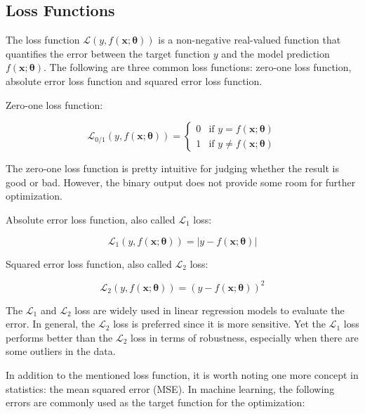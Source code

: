 \documentclass[
	parskip, 			   %
	twoside, 			   %
	DIV=14, 			   %
	BCOR=15.0mm, 		   %
	headsepline, 		   %
	open=right, 		   %
	captions=tableheading, %
	bibliography=totoc,    %
	numbers=noenddot       %
]{scrreprt}
\begin{document}
\subsection{Loss Functions}
The loss function $\mathcal{L}\left( y,f(\mathbf{x};\mathbf{\theta}) \right)$ is a non-negative real-valued function that quantifies the error between the target function $y$ and the model prediction $f(\mathbf{x};\mathbf{\theta})$. The following are three common loss functions: zero-one loss function, absolute error loss function and squared error loss function.

Zero-one loss function:

\begin{equation}
    \label{eq:zero_one_loss}
    \mathcal{L}_{0/1}\left( y,f \left(\mathbf{x};\mathbf{\theta} \right) \right) = \begin{cases} 0 & \text{if } y=f(\mathbf{x};\mathbf{\theta}) \\ 1 & \text{if } y \neq f(\mathbf{x};\mathbf{\theta})
    \end{cases}
\end{equation}

The zero-one loss function is pretty intuitive for judging whether the result is good or bad. However, the binary output does not provide some room for further optimization.

Absolute error loss function, also called $\mathcal{L}_{1}$ loss:

\begin{equation}
    \label{eq:AE_loss}
    \mathcal{L}_{1}\left( y,f(\mathbf{x};\mathbf{\theta}) \right) = |y-f(\mathbf{x};\mathbf{\theta})|
\end{equation}

Squared error loss function, also called $\mathcal{L}_{2}$ loss:

\begin{equation}
    \label{eq:SE_loss}
    \mathcal{L}_{2}\left( y,f(\mathbf{x};\mathbf{\theta}) \right) = (y-f(\mathbf{x};\mathbf{\theta}))^2
\end{equation}

The $\mathcal{L}_{1}$ and $\mathcal{L}_{2}$ loss are widely used in linear regression models to evaluate the error. In general, the $\mathcal{L}_{2}$ loss is preferred since it is more sensitive. Yet the $\mathcal{L}_{1}$ loss performs better than the $\mathcal{L}_{2}$ loss in terms of robustness, especially when there are some outliers in the data.

In addition to the mentioned loss function, it is worth noting one more concept in statistics: the mean squared error (MSE). In machine learning, the following errors are commonly used as the target function for the optimization:
\end{document}

